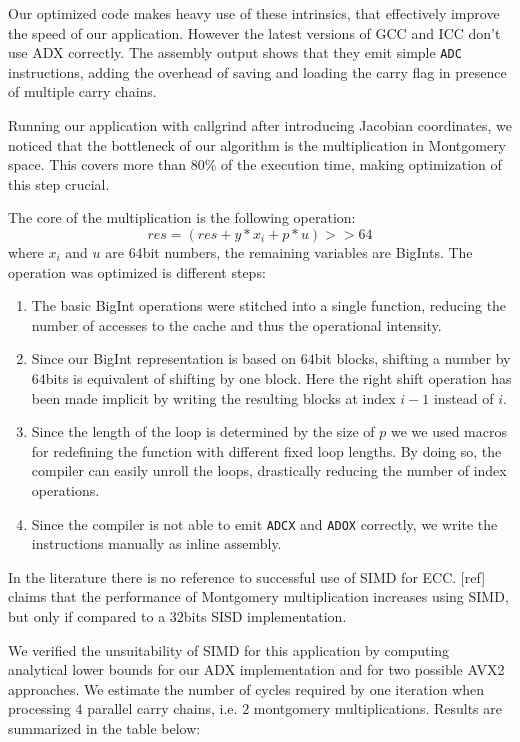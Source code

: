Our optimized code makes heavy use of these intrinsics, that effectively improve the speed of our application. However the latest versions of GCC and ICC don't use ADX correctly. The assembly output shows that they emit simple \texttt{ADC} instructions, adding the overhead of saving and loading the carry flag in presence of multiple carry chains.

Running our application with callgrind after introducing Jacobian coordinates, we noticed that the bottleneck of our algorithm is the multiplication in Montgomery space. This covers more than $80\%$ of the execution time, making optimization of this step crucial.
 
The core of the multiplication is the following operation:
$$res = \left(res + y * x_i + p * u\right) >> 64$$
where $x_i$ and $u$ are $64$bit numbers, the remaining variables are BigInts. The operation was optimized is different steps:
\begin{enumerate}
\item The basic BigInt operations were stitched into a single function, reducing the number of accesses to the cache and thus the operational intensity.
\item Since our BigInt representation is based on $64$bit blocks, shifting a number by $64$bits is equivalent of shifting by one block. Here the right shift operation has been made implicit by writing the resulting blocks at index $i-1$ instead of $i$.
\item Since the length of the loop is determined by the size of $p$ we we used macros for redefining the function with different fixed loop lengths. By doing so, the compiler can easily unroll the loops, drastically reducing the number of index operations. 
\item Since the compiler is not able to emit \texttt{ADCX} and \texttt{ADOX} correctly, we write the instructions manually as inline assembly.
\end{enumerate}

In the literature there is no reference to successful use of SIMD for ECC. [ref] claims that the performance of Montgomery multiplication increases using SIMD, but only if compared to a $32$bits SISD implementation.

We verified the unsuitability of SIMD for this application by computing analytical lower bounds for our ADX implementation and for two possible AVX2 approaches.
We estimate the number of cycles required by one iteration when processing $4$ parallel carry chains, i.e. $2$ montgomery multiplications. Results are summarized in the table below:

